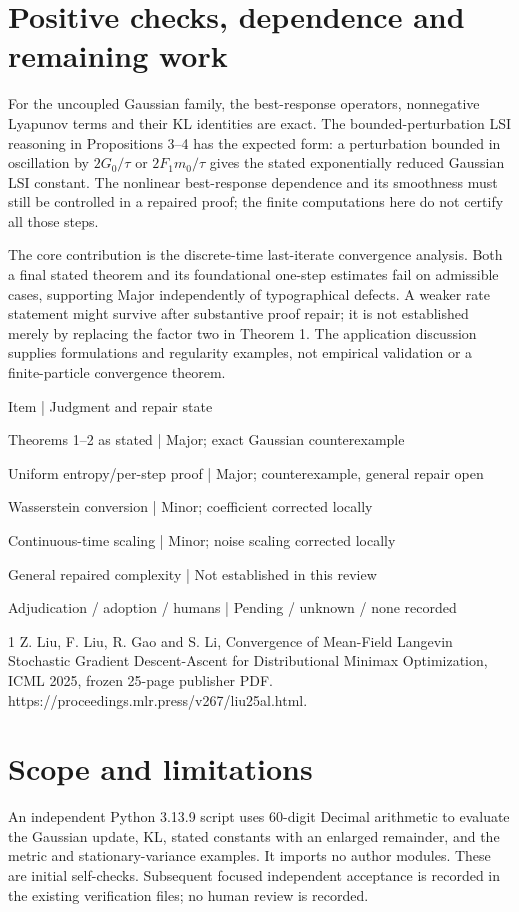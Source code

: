 \documentclass[10pt]{article}
\begin{document}
\section*{Positive checks, dependence and remaining work}
For the uncoupled Gaussian family, the best-response operators, nonnegative Lyapunov terms and their KL identities are exact. The bounded-perturbation LSI reasoning in Propositions 3–4 has the expected form: a perturbation bounded in oscillation by \(2G_0/\tau\) or \(2F_1m_0/\tau\) gives the stated exponentially reduced Gaussian LSI constant. The nonlinear best-response dependence and its smoothness must still be controlled in a repaired proof; the finite computations here do not certify all those steps.\par
The core contribution is the discrete-time last-iterate convergence analysis. Both a final stated theorem and its foundational one-step estimates fail on admissible cases, supporting Major independently of typographical defects. A weaker rate statement might survive after substantive proof repair; it is not established merely by replacing the factor two in Theorem 1. The application discussion supplies formulations and regularity examples, not empirical validation or a finite-particle convergence theorem.\par
Item | Judgment and repair state\par
Theorems 1–2 as stated | Major; exact Gaussian counterexample\par
Uniform entropy/per-step proof | Major; counterexample, general repair open\par
Wasserstein conversion | Minor; coefficient corrected locally\par
Continuous-time scaling | Minor; noise scaling corrected locally\par
General repaired complexity | Not established in this review\par
Adjudication / adoption / humans | Pending / unknown / none recorded\par
1 Z. Liu, F. Liu, R. Gao and S. Li, Convergence of Mean-Field Langevin Stochastic Gradient Descent-Ascent for Distributional Minimax Optimization, ICML 2025, frozen 25-page publisher PDF. https://proceedings.mlr.press/v267/liu25al.html.\par
\section*{Scope and limitations}
An independent Python 3.13.9 script uses 60-digit Decimal arithmetic to evaluate the Gaussian update, KL, stated constants with an enlarged remainder, and the metric and stationary-variance examples. It imports no author modules. These are initial self-checks. Subsequent focused independent acceptance is recorded in the existing verification files; no human review is recorded.\par
\end{document}
